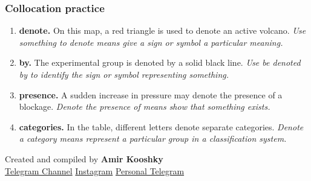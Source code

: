 \documentclass[11pt]{article}
\begin{document}
\subsubsection{Collocation practice}
\begin{enumerate}
  \item \textbf{denote.} On this map, a red triangle is used to denote an active volcano. \emph{Use something to denote means give a sign or symbol a particular meaning.}
  \item \textbf{by.} The experimental group is denoted by a solid black line. \emph{Use be denoted by to identify the sign or symbol representing something.}
  \item \textbf{presence.} A sudden increase in pressure may denote the presence of a blockage. \emph{Denote the presence of means show that something exists.}
  \item \textbf{categories.} In the table, different letters denote separate categories. \emph{Denote a category means represent a particular group in a classification system.}
\end{enumerate}

\vfill
\begin{center}
\small\color{Muted} Created and compiled by \textbf{Amir Kooshky}\\
\href{https://t.me/KooshkyTOEFL}{Telegram Channel}\quad\textbullet\quad
\href{https://www.instagram.com/kooshkytoefl}{Instagram}\quad\textbullet\quad
\href{https://t.me/KooshkyTOEFL\_pv}{Personal Telegram}
\end{center}
\end{document}
